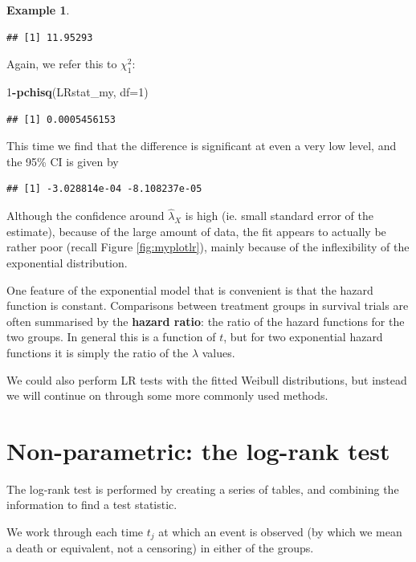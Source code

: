\documentclass[
  openany]{book}
\newenvironment{Shaded}{\begin{snugshade}}{\end{snugshade}}
\newcommand{\AttributeTok}[1]{\textcolor[rgb]{0.13,0.29,0.53}{#1}}
\newcommand{\DecValTok}[1]{\textcolor[rgb]{0.00,0.00,0.81}{#1}}
\newcommand{\FunctionTok}[1]{\textcolor[rgb]{0.13,0.29,0.53}{\textbf{#1}}}
\newcommand{\NormalTok}[1]{#1}
\newcommand{\SpecialCharTok}[1]{\textcolor[rgb]{0.81,0.36,0.00}{\textbf{#1}}}
\theoremstyle{definition}
\theoremstyle{definition}
\newtheorem{example}{Example}[chapter]
\theoremstyle{definition}
\theoremstyle{definition}
\theoremstyle{remark}
\begin{document}
\begin{example}
\begin{verbatim}
## [1] 11.95293
\end{verbatim}

Again, we refer this to \(\chi^2_1\):

\begin{Shaded}
\begin{Highlighting}[]
\DecValTok{1}\SpecialCharTok{{-}}\FunctionTok{pchisq}\NormalTok{(LRstat\_my, }\AttributeTok{df=}\DecValTok{1}\NormalTok{)}
\end{Highlighting}
\end{Shaded}

\begin{verbatim}
## [1] 0.0005456153
\end{verbatim}

This time we find that the difference is significant at even a very low level, and the 95\% CI is given by

\begin{verbatim}
## [1] -3.028814e-04 -8.108237e-05
\end{verbatim}

Although the confidence around \(\hat\lambda_X\) is high (ie. small standard error of the estimate), because of the large amount of data, the fit appears to actually be rather poor (recall Figure \ref{fig:myplotlr}), mainly because of the inflexibility of the exponential distribution.
\end{example}

One feature of the exponential model that is convenient is that the hazard function is constant. Comparisons between treatment groups in survival trials are often summarised by the \textbf{hazard ratio}: the ratio of the hazard functions for the two groups. In general this is a function of \(t\), but for two exponential hazard functions it is simply the ratio of the \(\lambda\) values.

We could also perform LR tests with the fitted Weibull distributions, but instead we will continue on through some more commonly used methods.

\section{Non-parametric: the log-rank test}\label{non-parametric-the-log-rank-test}

The log-rank test is performed by creating a series of tables, and combining the information to find a test statistic.

We work through each time \(t_j\) at which an event is observed (by which we mean a death or equivalent, not a censoring) in either of the groups.
\end{document}

